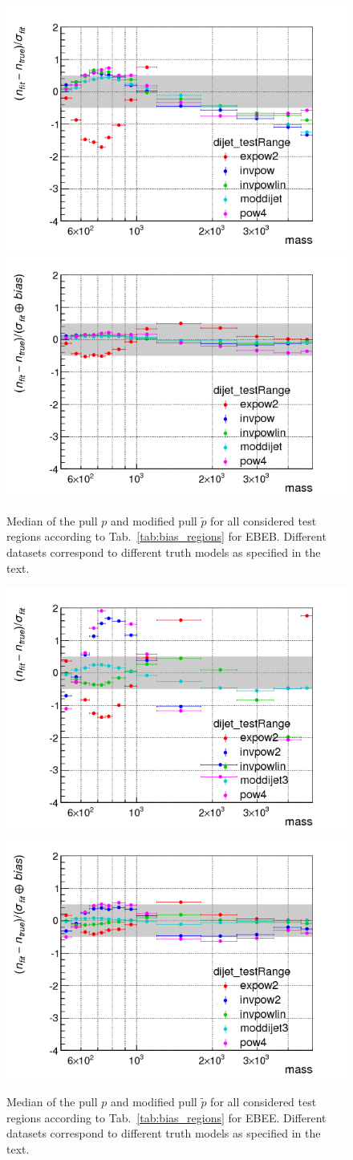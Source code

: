 \begin{figure}[!h]
    \includegraphics[width = .45\textwidth]{figures/diphotons/profile_pull_dijet_testRange_EBEB.png}
    \includegraphics[width = .45\textwidth]{figures/diphotons/profile_corr_pull_dijet_testRange_EBEB.png}
    \caption{
      Median of the pull $p$ and modified pull $\tilde p$ for all considered test
      regions according to Tab.~\ref{tab:bias_regions} for EBEB. Different datasets correspond to different truth models as specified in the text.
      \label{fig:profile_bias_EBEB}
}
\end{figure}
\begin{figure}[!h]
    \includegraphics[width = .45\textwidth]{figures/diphotons/profile_pull_dijet_testRange_EBEE.png}
    \includegraphics[width = .45\textwidth]{figures/diphotons/profile_corr_pull_dijet_testRange_EBEE.png}
    \caption{
      Median of the pull $p$ and modified pull $\tilde p$ for all considered test
      regions according to Tab.~\ref{tab:bias_regions} for EBEE. Different datasets correspond to different truth models as specified in the text.
      \label{fig:profile_bias_EBEE}
}
\end{figure}

